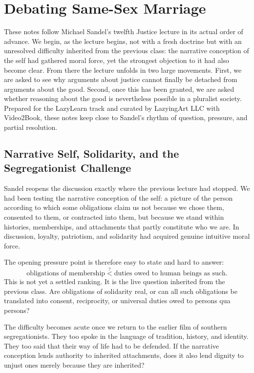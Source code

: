 \chapter{Debating Same-Sex Marriage}

These notes follow Michael Sandel's twelfth Justice lecture in its actual order of advance. We begin, as the lecture begins, not with a fresh doctrine but with an unresolved difficulty inherited from the previous class: the narrative conception of the self had gathered moral force, yet the strongest objection to it had also become clear. From there the lecture unfolds in two large movements. First, we are asked to see why arguments about justice cannot finally be detached from arguments about the good. Second, once this has been granted, we are asked whether reasoning about the good is nevertheless possible in a pluralist society. Prepared for the LazyLearn track and curated by LazyingArt LLC with Video2Book, these notes keep close to Sandel's rhythm of question, pressure, and partial resolution.

\section{Narrative Self, Solidarity, and the Segregationist Challenge}

Sandel reopens the discussion exactly where the previous lecture had stopped. We had been testing the narrative conception of the self: a picture of the person according to which some obligations claim us not because we chose them, consented to them, or contracted into them, but because we stand within histories, memberships, and attachments that partly constitute who we are. In discussion, loyalty, patriotism, and solidarity had acquired genuine intuitive moral force.

The opening pressure point is therefore easy to state and hard to answer:
\begin{equation}
\text{obligations of membership}
\stackrel{?}{<}
\text{duties owed to human beings as such}.
\end{equation}
This is not yet a settled ranking. It is the live question inherited from the previous class. Are obligations of solidarity real, or can all such obligations be translated into consent, reciprocity, or universal duties owed to persons qua persons?

The difficulty becomes acute once we return to the earlier film of southern segregationists. They too spoke in the language of tradition, history, and identity. They too said that their way of life had to be defended. If the narrative conception lends authority to inherited attachments, does it also lend dignity to unjust ones merely because they are inherited?

